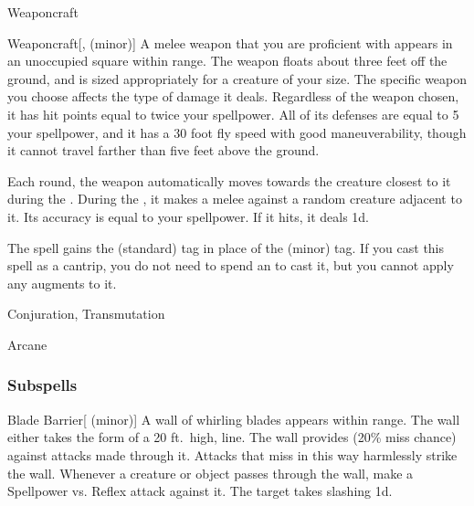 \newpage
\begin{spellsection}{Weaponcraft}

\begin{spellheader}
\end{spellheader}


\begin{ability}{Weaponcraft}[,  (minor)]
A melee weapon that you are proficient with appears in an unoccupied square within \rngmed range.
The weapon floats about three feet off the ground, and is sized appropriately for a creature of your size.
The specific weapon you choose affects the type of damage it deals.
Regardless of the weapon chosen, it has hit points equal to twice your spellpower.
All of its defenses are equal to 5 \add your spellpower, and it has a 30 foot fly speed with good maneuverability, though it cannot travel farther than five feet above the ground.

Each round, the weapon automatically moves towards the creature closest to it during the .
During the , it makes a melee  against a random creature adjacent to it.
Its accuracy is equal to your spellpower.
If it hits, it deals  \minus1d.
\end{ability}



 The spell gains the  (standard) tag in place of the  (minor) tag. If you cast this spell as a cantrip,
you do not need to spend an  to cast it,
but you cannot apply any augments to it.


 Conjuration, Transmutation

 Arcane
\end{spellsection}


\subsubsection{Subspells}


\begin{ability}[\nth{1}]{Blade Barrier}[ (minor)]
A wall of whirling blades appears within \rngmed range.
The wall either takes the form of a 20 ft.\ high, \arealarge line.
The wall provides  (20\% miss chance) against attacks made through it.
Attacks that miss in this way harmlessly strike the wall.
Whenever a creature or object passes through the wall, make a Spellpower vs. Reflex attack against it.
\hit The target takes slashing  \minus1d.
\end{ability}
\vspace{0.25em}


